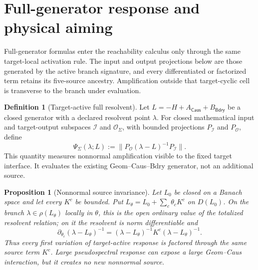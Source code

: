 \documentclass[11pt]{article}
\numberwithin{section}{part}
\theoremstyle{plain}
\newtheorem{proposition}[proposition]{Proposition}
\theoremstyle{definition}
\newtheorem{definition}[definition]{Definition}
\theoremstyle{remark}
\newcommand{\Caus}{\mathsf{Caus}}
\newcommand{\Bdry}{\mathsf{Bdry}}
\begin{document}
\section{Full-generator response and physical aiming}
\label{sec:full-generator-aiming}

Full-generator formulas enter the reachability calculus only through the
same target-local activation rule.  The input and output projections below
are those generated by the active branch signature, and every differentiated
or factorized term retains its five-source ancestry.  Amplification outside
that target-cyclic cell is transverse to the branch under evaluation.

\begin{definition}[Target-active full resolvent]
\label{def:target-active-resolvent}
Let \(L=-H+A_{\Caus}+B_{\Bdry}\) be a closed generator with a declared
resolvent point \(\lambda\).  For closed mathematical input and target-output
subspaces \(\mathscr I\) and \(\mathscr O_\Sigma\), with bounded projections
\(P_{\mathscr I}\) and \(P_{\mathscr O}\), define
\begin{equation}
 \label{eq:target-active-full-resolvent}
 \Psi_\Sigma(\lambda;L)
 :=\bigl\|P_{\mathscr O}(\lambda-L)^{-1}P_{\mathscr I}\bigr\|.
\end{equation}
This quantity measures nonnormal amplification visible to the fixed target
interface.  It evaluates the existing Geom--Caus--Bdry generator,
not an additional source.
\end{definition}

\begin{proposition}[Nonnormal source invariance]
\label{prop:nonnormal-source-invariance}
Let \(L_0\) be closed on a Banach space and let every \(K^c\) be bounded.
Put \(L_\theta=L_0+\sum_c\theta_cK^c\) on \(D(L_0)\).  On the branch
\(\lambda\in\rho(L_\theta)\) locally in \(\theta\), this is the open
ordinary value of the totalized resolvent relation; on it the resolvent is
norm differentiable and
\begin{equation}
 \label{eq:resolvent-source-derivative}
 \partial_{\theta_c}(\lambda-L_\theta)^{-1}
 =(\lambda-L_\theta)^{-1}K^c(\lambda-L_\theta)^{-1}.
\end{equation}
Thus every first variation of target-active response is factored through the
same source term \(K^c\).  Large pseudospectral response can expose a large
Geom--Caus interaction, but it creates no new nonnormal source.
\end{proposition}
\end{document}
